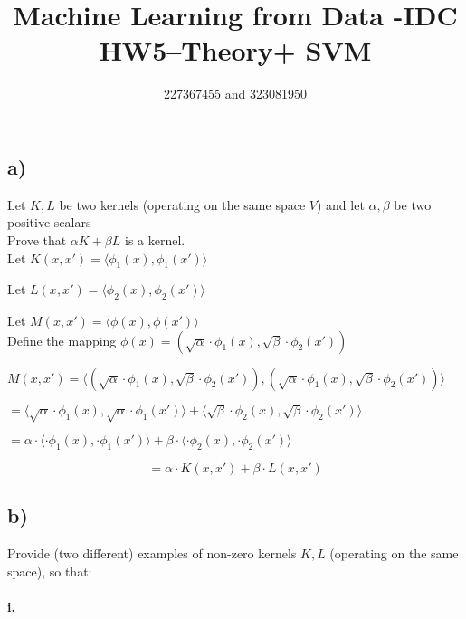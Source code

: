 \documentclass[12pt]{article}
\title{Machine Learning from Data -IDC\\HW5–Theory+ SVM}
\author{227367455 and 323081950}
\newcommand\tab[1][1cm]{\hspace*{#1}}
\begin{document}
\maketitle

\section*{}

\subsection*{a)}

Let $K,L$ be two kernels (operating on the same space $V$) and let $ \alpha, \beta $ be two positive scalars \\
\tab Prove that $\alpha K + \beta L $ is a kernel.\\

Let $K(x, x') = \langle \phi_1(x),  \phi_1(x') \rangle $

Let $L(x, x') = \langle \phi_2(x),  \phi_2(x') \rangle $

Let $M(x, x') =  \langle \phi(x),  \phi(x') \rangle $\\

Define the mapping $\phi(x) = (\sqrt{\alpha} \cdot \phi_1(x),  \sqrt{\beta} \cdot  \phi_2(x') ) $

$M(x, x') =  \langle (\sqrt{\alpha} \cdot \phi_1(x),  \sqrt{\beta} \cdot  \phi_2(x') ) ,  (\sqrt{\alpha} \cdot \phi_1(x),  \sqrt{\beta} \cdot  \phi_2(x') )  \rangle $

$=  \langle \sqrt{\alpha} \cdot \phi_1(x),  \sqrt{\alpha} \cdot \phi_1(x') \rangle + \langle \sqrt{\beta} \cdot \phi_2(x),  \sqrt{\beta} \cdot \phi_2(x') \rangle $


$= {\alpha} \cdot  \langle  \cdot \phi_1(x),   \cdot \phi_1(x') \rangle + {\beta} \cdot \langle \cdot \phi_2(x),  \cdot \phi_2(x') \rangle $

$$= {\alpha}  \cdot  K(x, x') +  {\beta} \cdot L(x, x') $$
		
\subsection*{b)}

Provide (two different) examples of non-zero kernels $K,L$ (operating on the same space), so that:

\paragraph{\tab i.}
\end{document}
